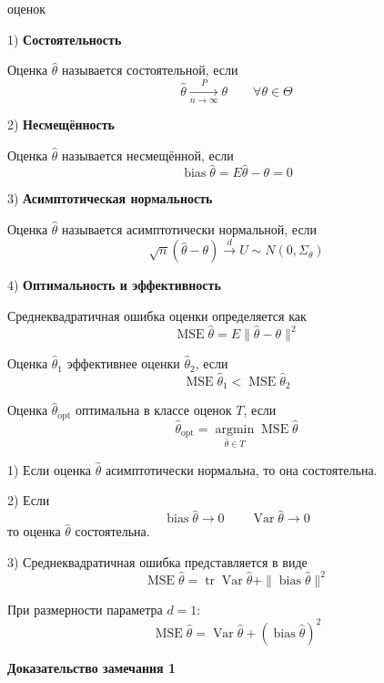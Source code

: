 \documentclass[12pt,a4paper]{article}
\begin{document}
\begin{props}{оценок}

1) \textbf{Состоятельность}

Оценка $\hat{\theta}$ называется состоятельной, если
\[
\hat{\theta}\xrightarrow[n\to\infty]{P}\theta
\qquad \forall \theta\in\Theta
\]

2) \textbf{Несмещённость}

Оценка $\hat{\theta}$ называется несмещённой, если
\[
\operatorname{bias}\hat{\theta}
=E\hat{\theta}-\theta=0
\]

3) \textbf{Асимптотическая нормальность}

Оценка $\hat{\theta}$ называется асимптотически нормальной, если
\[
\sqrt{n}(\hat{\theta}-\theta)
\xrightarrow{d} U\sim N(0,\Sigma_\theta)
\]

4) \textbf{Оптимальность и эффективность}

Среднеквадратичная ошибка оценки определяется как
\[
\operatorname{MSE}\hat{\theta}
=E\|\hat{\theta}-\theta\|^2
\]

Оценка $\hat{\theta}_1$ эффективнее оценки $\hat{\theta}_2$, если
\[
\operatorname{MSE}\hat{\theta}_1
<
\operatorname{MSE}\hat{\theta}_2
\]

Оценка $\hat{\theta}_{\mathrm{opt}}$ оптимальна в классе оценок $T$, если
\[
\hat{\theta}_{\mathrm{opt}}
=\underset{\hat{\theta}\in T}{\operatorname{argmin}}
\operatorname{MSE}\hat{\theta}
\]

\end{props}

\begin{note}
1) Если оценка $\hat{\theta}$ асимптотически нормальна, то она состоятельна.

2) Если
\[
\operatorname{bias}\hat{\theta}\to 0
\qquad
\operatorname{Var}\hat{\theta}\to 0
\]
то оценка $\hat{\theta}$ состоятельна.

3) Среднеквадратичная ошибка представляется в виде
\[
\operatorname{MSE}\hat{\theta}
=
\operatorname{tr}\operatorname{Var}\hat{\theta}
+
\|\operatorname{bias}\hat{\theta}\|^2
\]

При размерности параметра $d=1$:
\[
\operatorname{MSE}\hat{\theta}
=
\operatorname{Var}\hat{\theta}
+
(\operatorname{bias}\hat{\theta})^2
\]
\end{note}

\textbf{Доказательство замечания 1}
\end{document}
